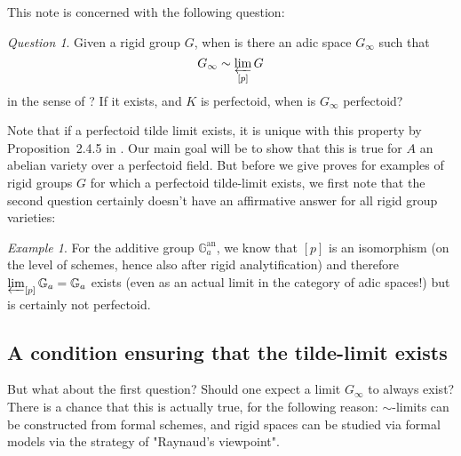 \documentclass[11pt,oneside]{amsart}
\theoremstyle{definition}
\theoremstyle{remark}
\newtheorem*{example}{Example}
\newtheorem*{question}{Question}
\begin{document}
	This note is concerned with the following question:
	
	\begin{framed}
	\begin{question}
		Given a rigid group $G$, when is there an adic space $G_\infty$ such that \[G_\infty \sim  \varprojlim_{[p]} G\] in the sense of \cite{SW}? If it exists, and $K$ is perfectoid, when is $G_\infty$ perfectoid?
	\end{question}
	\end{framed}
	Note that if a perfectoid tilde limit exists, it is unique with this property by Proposition~2.4.5 in \cite{SW}.
	Our main goal will be to show that this is true for $A$ an abelian variety over a perfectoid field.
	But before we give proves for examples of rigid groups $G$ for which a perfectoid tilde-limit exists, we first note that the second question certainly doesn't have an affirmative answer for all rigid group varieties:
	\begin{example}
		For the additive group $\mathbb G_a^{\operatorname{an}}$, we know that $[p]$ is an isomorphism (on the level of schemes, hence also after rigid analytification) and therefore $\varprojlim_{[p]} \mathbb G_a=\mathbb G_a$ exists (even as an actual limit in the category of adic spaces!) but is certainly not perfectoid.
	\end{example}
	\subsection{A condition ensuring that the tilde-limit exists}
	But what about the first question? Should one expect a limit $G_\infty$ to always exist? There is a chance that this is actually true, for the following reason: $\sim$-limits can be constructed from formal schemes, and rigid spaces can be studied via formal models via the strategy of "Raynaud's viewpoint".
	
\end{document}

